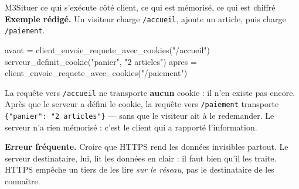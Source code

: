 \begin{fichemethode}{M3}{Situer ce qui s'exécute côté client, ce qui est mémorisé, ce qui est chiffré}
\textbf{Exemple rédigé.} Un visiteur charge \lstinline{/accueil}, ajoute un article, puis
charge \lstinline{/paiement}.

\begin{python}
avant = client_envoie_requete_avec_cookies("/accueil")
serveur_definit_cookie("panier", "2 articles")
apres = client_envoie_requete_avec_cookies("/paiement")
\end{python}

La requête vers \lstinline{/accueil} ne transporte \textbf{aucun} cookie : il n'en existe pas
encore. Après que le serveur a défini le cookie, la requête vers \lstinline{/paiement}
transporte \lstinline|{"panier": "2 articles"}| — sans que le visiteur ait à le redemander.
Le serveur n'a rien mémorisé : c'est le client qui a rapporté l'information.

\textbf{Erreur fréquente.} Croire que HTTPS rend les données invisibles partout. Le serveur
destinataire, lui, lit les données en clair : il faut bien qu'il les traite. HTTPS empêche un
tiers de les lire \emph{sur le réseau}, pas le destinataire de les connaître.

\end{fichemethode}
